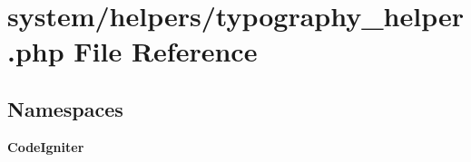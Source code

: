 \section{system/helpers/typography\-\_\-helper.php File Reference}
\label{typography__helper_8php}
\subsection*{Namespaces}
\begin{DoxyCompactItemize}
\item 
{\bf Code\-Igniter}
\end{DoxyCompactItemize}
